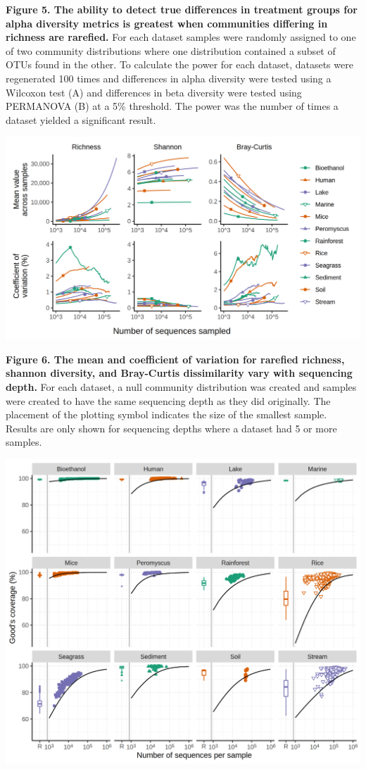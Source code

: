 \documentclass[
]{article}
\begin{document}
\textbf{Figure 5. The ability to detect true differences in treatment
groups for alpha diversity metrics is greatest when communities
differing in richness are rarefied.} For each dataset samples were
randomly assigned to one of two community distributions where one
distribution contained a subset of OTUs found in the other. To calculate
the power for each dataset, datasets were regenerated 100 times and
differences in alpha diversity were tested using a Wilcoxon test (A) and
differences in beta diversity were tested using PERMANOVA (B) at a 5\%
threshold. The power was the number of times a dataset yielded a
significant result.

\newpage

\includegraphics{figure_6.png}

\textbf{Figure 6. The mean and coefficient of variation for rarefied
richness, shannon diversity, and Bray-Curtis dissimilarity vary with
sequencing depth.} For each dataset, a null community distribution was
created and samples were created to have the same sequencing depth as
they did originally. The placement of the plotting symbol indicates the
size of the smallest sample. Results are only shown for sequencing
depths where a dataset had 5 or more samples.

\newpage

\includegraphics{figure_7.png}
\end{document}
